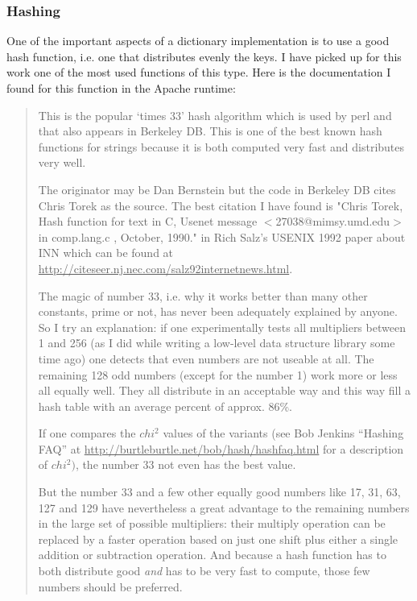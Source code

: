 \documentclass[12pt,a4paper]{memoir} %
\begin{document}
{{\subsubsection{Hashing}
\renewcommand{\container}{hash}
One of the important aspects of a dictionary implementation is to use a good hash function, i.e. one that distributes evenly the keys. I have picked
up for this work one of the most used functions of this type. Here is the documentation I found for this function in the Apache runtime:
\par\indent
\begin{quotation}{
This is the popular `times 33' hash algorithm which is used by perl and that also appears in Berkeley DB. This is one of the best
 known hash functions for strings because it is both computed very fast and distributes very well.
   
 The originator may be Dan Bernstein but the code in Berkeley DB cites Chris Torek as the source. The best citation I have found
 is "Chris Torek, Hash function for text in C, Usenet message  $<$27038@mimsy.umd.edu$>$ in comp.lang.c , October, 1990." in Rich
 Salz's USENIX 1992 paper about INN which can be found at  \underline{http://citeseer.nj.nec.com/salz92internetnews.html}.
\par

    The magic of number 33, i.e. why it works better than many other constants, prime or not, has never been adequately explained by
 anyone. So I try an explanation: if one experimentally tests all  multipliers between 1 and 256 (as I did while writing a low-level
 data structure library some time ago) one detects that even numbers are not useable at all. The remaining 128 odd numbers
 (except for the number 1) work more or less all equally well.  They all distribute in an acceptable way and this way fill a hash
 table with an average percent of approx. 86\%.
 
   If one compares the $chi^{2}$ 
 values of the variants (see Bob Jenkins ``Hashing FAQ'' at \underline{
 http://burtleburtle.net/bob/hash/hashfaq.html}  for a description  of $chi^{2})$, the number 33 not even has the best value. \par But the
 number 33 and a few other equally good numbers like 17, 31, 63, 127 and 129 have nevertheless a great advantage to the remaining
 numbers in the large set of possible multipliers: their multiply operation can be replaced by a faster operation based on just one
 shift plus either a single addition or subtraction operation. And  because a hash function has to both distribute good \textsl{and} has to
 be very fast to compute, those few numbers should be preferred.


}
\end{quotation}}}
\end{document}
